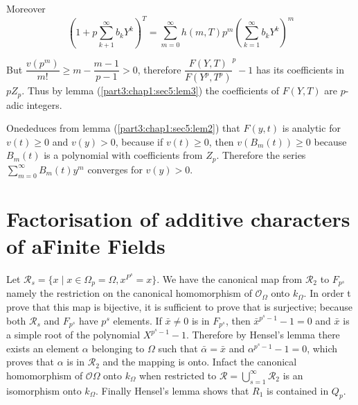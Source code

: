 Moreover 
$$
\left(1+p\sum_{k+1}^\infty b_k Y^k\right)^T= \sum_{m=0}^\infty h(m,T) p^m \left(\sum
_{k=1}^\infty b_k Y^k\right)^m 
$$

But  $\dfrac{v(p^m)}{m!}\ge m - \dfrac{m-1}{p-1} > 0$, therefore
$\dfrac{F(Y,T)}{F(Y^p, T^p)}  ^p -1$ has its coefficients in $p
Z_p$. Thus by lemma (\ref{part3:chap1:sec5:lem3}) the coefficients of
$F(Y,T)$ are $p$-adic integers. 

One\pageoriginale deduces from lemma (\ref{part3:chap1:sec5:lem2}) that $F(y,t)$ is analytic for $v(t)\ge 0$ 
and $v(y) > 0$, because if $v(t)\ge 0$, then $v(B_m(t)) \ge 0$
because $B_m (t)$ is a polynomial with coefficients from
$Z_p$. Therefore the series $\sum \limits _{m=0}^\infty B_m(t)y^m$
converges for $v(y) > 0$. 

\section[Factorisation of additive characters of a Finite
  Fields]{Factorisation of additive characters of a\hfil\break Finite
  Fields}\label{part3:chap1:sec6} 

Let $\mathscr{R}_s = \bigg\{x\mid x \in \Omega_p = \Omega, x^{P^s} = x
\bigg\}$. We have the canonical map from $\mathscr{R}_2$ to $F_{p^s}$
namely the restriction on the canonical homomorphism of
$\mathscr{O}_\Omega$ onto $k_\Omega$. In order t prove that this map
is  bijective,  it  is sufficient to prove  that is surjective;
because both $\mathscr{R}_s$ and $F_{p^s}$ have  $p^s$ elements.  If
$\bar{x} \neq 0$ is in $F_{p^s}$, then $\bar{x}^{p^s -1}-1=0$ and
$\bar{x}$ is a simple root of the polynomial $X^{p^s -1}-1
$. Therefore by Hensel's lemma there exists an element $\alpha$
belonging to $\Omega$ such that $\bar{\alpha}= \bar{x}$ and
$\alpha^{p^s -1}-1=0$, which proves that $\alpha$ is in
$\mathscr{R}_2$ and the mapping is onto.  Infact the canonical
homomorphism of $\mathscr{O} \Omega$ onto $k_\Omega$ when restricted
to $\mathscr{R}= \bigcup\limits_{s=1}^{\infty} \mathscr{R}_2$ is an
isomorphism onto $k_\Omega$. Finally Hensel's lemma shows that  $R_1$
is contained in $Q_p$.  

